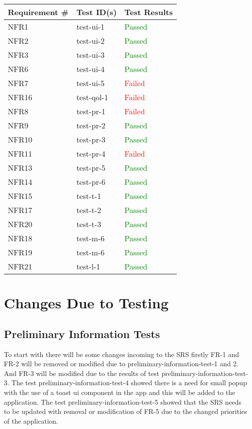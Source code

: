 \documentclass[12pt, titlepage]{article}
\begin{document}
\newpage
  \begin{table}[h!]
	
	\begin{tabular}{|p{3.5cm}|p{6.5cm}|p{4.5cm}|}

	\hline
	\textbf{Requirement \#} & \textbf{Test ID(s)}   &\textbf{Test Results}  \\ \hline
	NFR1 & test-ui-1 & \textcolor{green}{Passed} \\ \hline
	NFR2 & test-ui-2 & \textcolor{green}{Passed}   \\ \hline
	NFR3 & test-ui-3 & \textcolor{green}{Passed} \\ \hline
	NFR6 & test-ui-4 & \textcolor{green}{Passed} \\ \hline
	NFR7 & test-ui-5 & \textcolor{red}{Failed}  \\ \hline
	NFR16 & test-qol-1 & \textcolor{red}{Failed} \\ \hline
	NFR8 & test-pr-1 & \textcolor{red}{Failed}  \\ \hline
	NFR9 & test-pr-2 & \textcolor{green}{Passed} \\ \hline
	NFR10 & test-pr-3 & \textcolor{green}{Passed}\\ \hline
	NFR11 & test-pr-4 & \textcolor{red}{Failed} \\ \hline
	NFR13 & test-pr-5 & \textcolor{green}{Passed}\\ \hline
	NFR14 & test-pr-6 & \textcolor{green}{Passed}\\ \hline
	NFR15 & test-t-1 & \textcolor{green}{Passed}\\ \hline
	NFR17 & test-t-2 & \textcolor{green}{Passed}\\ \hline
	NFR20 & test-t-3 & \textcolor{green}{Passed}\\ \hline
	NFR18 & test-m-6 & \textcolor{green}{Passed}\\ \hline
	NFR19 & test-m-6 & \textcolor{green}{Passed}\\ \hline
	NFR21 & test-l-1 & \textcolor{green}{Passed}\\ \hline	
\end{tabular}
	
  \end{table}

\newpage

\section{Changes Due to Testing}

\subsection{Preliminary Information Tests}
To start with there will be some changes incoming to the SRS firstly FR-1 and FR-2 will be removed or modified due to 
preliminary-information-test-1 and 2. And FR-3 will be modified due to the results of test preliminary-information-test-3. 
The test preliminary-information-test-4 showed there is a need for small popup with the use of a toast ui component in the 
app and this will be added to the application. The test preliminary-information-test-5 showed that the SRS needs to be updated 
with removal or modification of FR-5 due to the changed priorities of the application.
\end{document}
